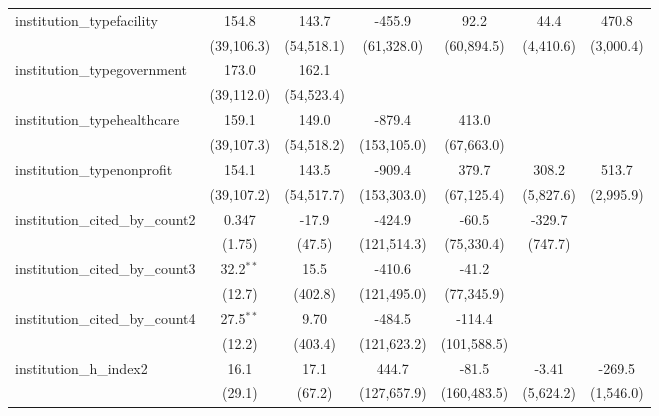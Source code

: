 \begin{tabular}{lcccccc}
   institution\_typefacility             & 154.8        & 143.7         & -455.9      & 92.2        & 44.4          & 470.8\\   
                                         & (39,106.3)   & (54,518.1)    & (61,328.0)  & (60,894.5)  & (4,410.6)     & (3,000.4)\\   
   institution\_typegovernment           & 173.0        & 162.1         &             &             &               &   \\   
                                         & (39,112.0)   & (54,523.4)    &             &             &               &   \\   
   institution\_typehealthcare           & 159.1        & 149.0         & -879.4      & 413.0       &               &   \\   
                                         & (39,107.3)   & (54,518.2)    & (153,105.0) & (67,663.0)  &               &   \\   
   institution\_typenonprofit            & 154.1        & 143.5         & -909.4      & 379.7       & 308.2         & 513.7\\   
                                         & (39,107.2)   & (54,517.7)    & (153,303.0) & (67,125.4)  & (5,827.6)     & (2,995.9)\\   
   institution\_cited\_by\_count2        & 0.347        & -17.9         & -424.9      & -60.5       & -329.7        &   \\   
                                         & (1.75)       & (47.5)        & (121,514.3) & (75,330.4)  & (747.7)       &   \\   
   institution\_cited\_by\_count3        & 32.2$^{**}$  & 15.5          & -410.6      & -41.2       &               &   \\   
                                         & (12.7)       & (402.8)       & (121,495.0) & (77,345.9)  &               &   \\   
   institution\_cited\_by\_count4        & 27.5$^{**}$  & 9.70          & -484.5      & -114.4      &               &   \\   
                                         & (12.2)       & (403.4)       & (121,623.2) & (101,588.5) &               &   \\   
   institution\_h\_index2                & 16.1         & 17.1          & 444.7       & -81.5       & -3.41         & -269.5\\   
                                         & (29.1)       & (67.2)        & (127,657.9) & (160,483.5) & (5,624.2)     & (1,546.0)\\   

\end{tabular}
